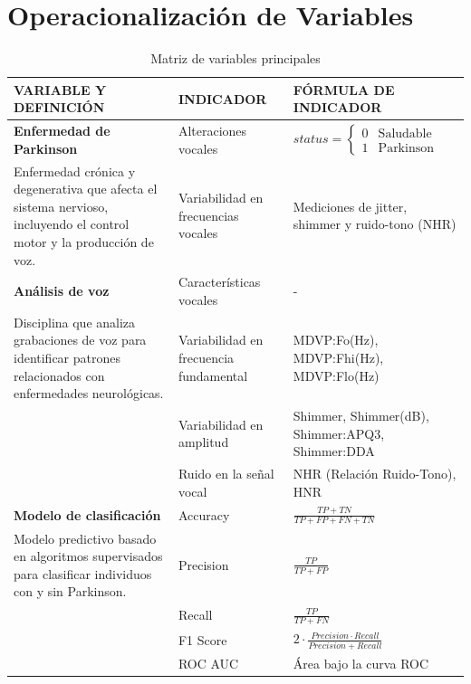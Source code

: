 \documentclass[listof=nochaptergap,12pt,times,authoryear]{report}
\begin{document}
\section{Operacionalización de Variables}
\begin{table}[H]
    \centering
    \caption{Matriz de variables principales}
    \label{tabla:matriz_variables}
    \begin{tabular}{|p{4.5cm}|p{4.5cm}|p{5cm}|}
        \hline
        \rowcolor[HTML]{C6E0B4} 
        \textbf{VARIABLE Y DEFINICIÓN} & \textbf{INDICADOR} & \textbf{FÓRMULA DE INDICADOR} \\ \hline
        \textbf{Enfermedad de Parkinson} & Alteraciones vocales & 
        $status = 
        \begin{cases} 
        0 & \text{Saludable} \\ 
        1 & \text{Parkinson} 
        \end{cases}$ \\ \cline{2-3}
        Enfermedad crónica y degenerativa que afecta el sistema nervioso, incluyendo el control motor y la producción de voz. & Variabilidad en frecuencias vocales & Mediciones de jitter, shimmer y ruido-tono (NHR) \\ \hline
        
        \textbf{Análisis de voz} & Características vocales & - \\ \cline{2-3}
        Disciplina que analiza grabaciones de voz para identificar patrones relacionados con enfermedades neurológicas. & Variabilidad en frecuencia fundamental & MDVP:Fo(Hz), MDVP:Fhi(Hz), MDVP:Flo(Hz) \\ \cline{2-3}
        & Variabilidad en amplitud & Shimmer, Shimmer(dB), Shimmer:APQ3, Shimmer:DDA \\ \cline{2-3}
        & Ruido en la señal vocal & NHR (Relación Ruido-Tono), HNR \\ \hline
        
        \textbf{Modelo de clasificación} & Accuracy & 
        $\frac{TP + TN}{TP + FP + FN + TN}$ \\ \cline{2-3}
        Modelo predictivo basado en algoritmos supervisados para clasificar individuos con y sin Parkinson. & Precision & $\frac{TP}{TP + FP}$ \\ \cline{2-3}
        & Recall & $\frac{TP}{TP + FN}$ \\ \cline{2-3}
        & F1 Score & $2 \cdot \frac{Precision \cdot Recall}{Precision + Recall}$ \\ \cline{2-3}
        & ROC AUC & Área bajo la curva ROC \\ \hline
    \end{tabular}
    \vspace{0.5cm}
    

\end{table}
\end{document}
